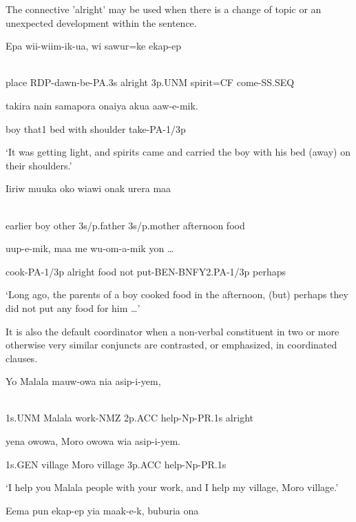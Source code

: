 The connective  'alright' may be used when there is a change of topic or an unexpected development within the sentence.

\ea%
\label{ex:x1376}
\gll Epa  wii-wiim-ik-ua,    wi  sawur=ke  ekap-ep  \\
      \\
\glt
\z

place  RDP-dawn-be-PA.3s  alright  3p.UNM  spirit=CF  come-SS.SEQ

takira  nain  samapora  onaiya  akua  aaw-e-mik.

boy  that1  bed  with  shoulder  take-PA-1/3p

`It was getting light, and spirits came and carried the boy with his bed (away) on their shoulders.'

\ea%
\label{ex:x1377}
\gll Iiriw  muuka  oko  wiawi  onak  urera  maa  \\
      \\
\glt
\z

earlier  boy  other  3s/p.father  3s/p.mother  afternoon  food

uup-e-mik,    maa  me  wu-om-a-mik  yon  {\dots}

cook-PA-1/3p  alright  food  not  put-BEN-BNFY2.PA-1/3p  perhaps

`Long ago, the parents of a boy cooked food in the afternoon, (but) perhaps they did not put any food for him {\dots}'

It is also the default coordinator when a non-verbal constituent in two or more otherwise very similar conjuncts are contrasted, or emphasized, in coordinated clauses.

\ea%
\label{ex:x1379}
\gll Yo  Malala  mauw-owa  nia  asip-i-yem,   \\
      \\
\glt
\z

1s.UNM  Malala  work-NMZ  2p.ACC  help-Np-PR.1s  alright

yena  owowa,  Moro  owowa  wia  asip-i-yem.

1s.GEN  village  Moro  village  3p.ACC  help-Np-PR.1s

`I help you Malala people with your work, and I help my village, Moro village.'

\ea%
\label{ex:x1380}
\gll Eema  pun  ekap-ep  yia  maak-e-k,    buburia  ona  \\
      \\
\glt
\z


